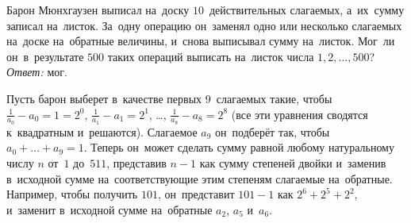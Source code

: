 \problem
Барон Мюнхгаузен выписал на~доску $10$~действительных слагаемых, а~их~сумму
записал на~листок.
За~одну операцию он~заменял одно или несколько слагаемых на~доске на~обратные
величины, и~снова выписывал сумму на~листок.
Мог~ли он~в~результате $500$ таких операций выписать на~листок числа
$1, 2, \ldots, 500$?
\solution
\emph{Ответ:} мог.
\par
Пусть барон выберет в~качестве первых $9$~слагаемых такие, чтобы
$\frac{1}{a_0} - a_0 = 1 = 2^0$,
$\frac{1}{a_1} - a_1 = 2^1$,
\ldots,
$\frac{1}{a_8} - a_8 = 2^8$
(все эти уравнения сводятся к~квадратным и~решаются).
Слагаемое $a_9$ он~подберёт так, чтобы $a_0 + \ldots + a_9 = 1$.
Теперь он~может сделать сумму равной любому натуральному числу $n$ от~$1$
до~$511$, представив $n - 1$ как сумму степеней двойки и~заменив в~исходной
сумме на~соответствующие этим степеням слагаемые на~обратные.
Например, чтобы получить $101$, он~представит $101 - 1$ как $2^6 + 2^5 + 2^2$,
и~заменит в~исходной сумме на~обратные $a_2$, $a_5$ и~$a_6$.
\endproblem
